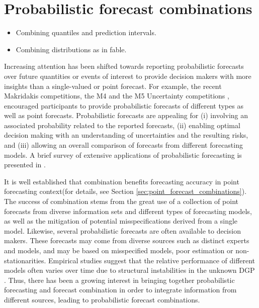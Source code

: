 \documentclass[11pt]{article}
\begin{document}
\section{Probabilistic forecast combinations}
\label{sec:probabilistic_forecast_combinations}

{\color{red}
\begin{itemize}
\item Combining quantiles and prediction intervals.
\item Combining distributions as in fable.
\end{itemize}
}

Increasing attention has been shifted towards reporting probabilistic forecasts over future quantities or events of interest to provide decision makers with more insights than a single-valued or point forecast. For example, the recent Makridakis competitions, the M4 and the M5 Uncertainty competitions \citep{Makridakis2020-lz}, encouraged participants to provide probabilistic forecasts of different types as well as point forecasts. Probabilistic forecasts are appealing for (i) involving an associated probability related to the reported forecasts, (ii) enabling optimal decision making with an understanding of uncertainties and the resulting risks, and (iii) allowing an overall comparison of forecasts from different forecasting models. A brief survey of extensive applications of probabilistic forecasting is presented in \cite{Gneiting2014-tz}.

It is well established that combination benefits forecasting accuracy in point forecasting context(for details, see Section \ref{sec:point_forecast_combinations}). The success of combination stems from the great use of a collection of point forecasts from diverse information sets and different types of forecasting models, as well as the mitigation of potential misspecifications derived from a single model. Likewise, several probabilistic forecasts are often available to decision makers. These forecasts may come from diverse sources such as distinct experts and models, and may be based on misspecified models, poor estimation or non-stationarities. Empirical studies suggest that the relative performance of different models often varies over time due to structural instabilities in the unknown DGP \citep[e.g.,][]{Billio2013-sg}. Thus, there has been a growing interest in bringing together probabilistic forecasting and forecast combination in order to integrate information from different sources, leading to probabilistic forecast combinations.
\end{document}
